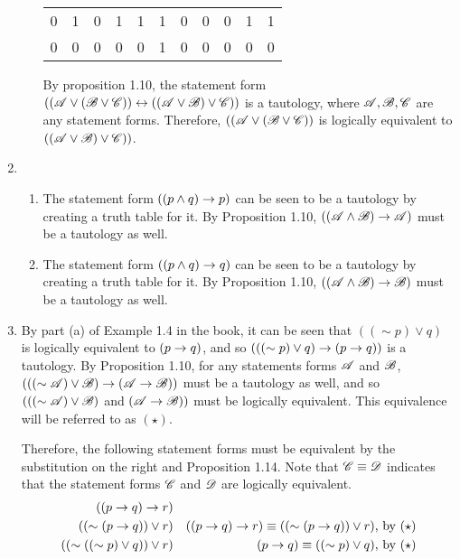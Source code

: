 \begin{enumerate}
\begin{enumerate}[label=(\alph*), align=left]
\begin{center}
\begin{tabular}{ccccccccccc}
            0&  %
            1&  %
            0&  %
            1&  %
            1&  %
            1&  %
            0&  %
            0&  %
            0&  %
            1&  %
            1\\ %

            0&  %
            0&  %
            0&  %
            0&  %
            0&  %
            1&  %
            0&  %
            0&  %
            0&  %
            0&  %
            0\\ %
          \end{tabular}
        \end{center}
        By proposition 1.10, the statement form \(((\mathscr{A} \lor (\mathscr{B} \lor \mathscr{C})) \leftrightarrow ((\mathscr{A} \lor \mathscr{B}) \lor \mathscr{C}))\) is a tautology, where \(\mathscr{A}, \mathscr{B}, \mathscr{C}\) are any statement forms. Therefore, \(((\mathscr{A} \lor (\mathscr{B} \lor \mathscr{C}))\) is logically equivalent to \(((\mathscr{A} \lor \mathscr{B}) \lor \mathscr{C}))\).
    \end{enumerate}
    
  \item %
    \begin{enumerate}[label=(\alph*), align=left]
      \item The statement form \(((p \land q) \rightarrow p)\) can be seen to be a tautology by creating a truth table for it. By Proposition 1.10, \(((\mathscr{A} \land \mathscr{B}) \rightarrow \mathscr{A})\) must be a tautology as well.
        
      \item The statement form \(((p \land q) \rightarrow q)\) can be seen to be a tautology by creating a truth table for it. By Proposition 1.10, \(((\mathscr{A} \land \mathscr{B}) \rightarrow \mathscr{B})\) must be a tautology as well.
    \end{enumerate}
  \item %
    By part (a) of Example 1.4 in the book, it can be seen that \(((\sim p) \lor q)\) is logically equivalent to \((p \rightarrow q)\), and so \((((\sim p) \lor q) \rightarrow (p \rightarrow q))\) is a tautology. By Proposition 1.10, for any statements forms \(\mathscr{A}\) and \(\mathscr{B}\), \((((\sim \mathscr{A}) \lor \mathscr{B}) \rightarrow (\mathscr{A} \rightarrow \mathscr{B}))\) must be a tautology as well, and so \((((\sim \mathscr{A}) \lor \mathscr{B})\) and \((\mathscr{A} \rightarrow \mathscr{B}))\) must be logically equivalent. This equivalence will be referred to as \((\star)\).

    Therefore, the following statement forms must be equivalent by the substitution on the right and Proposition 1.14. Note that \(\mathscr{C} \equiv \mathscr{D}\) indicates that the statement forms \(\mathscr{C}\) and \(\mathscr{D}\) are logically equivalent.
    \begin{align*}
      ((p \rightarrow q) \rightarrow r)&&
      \\
      ((\sim(p \rightarrow q)) \lor r)&&
      ((p \rightarrow q) \rightarrow r) \equiv ((\sim(p \rightarrow q)) \lor r) \text{, by \((\star)\)}\\
      ((\sim((\sim p) \lor q)) \lor r)&&
      (p \rightarrow q) \equiv ((\sim p) \lor q) \text{, by \((\star)\)}
    \end{align*}


\end{enumerate}

